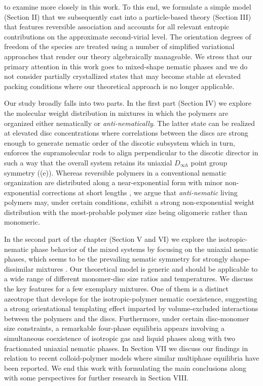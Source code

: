 to examine more closely in this work. To this end, we formulate a simple model (Section II) that we subsequently cast into  a  particle-based theory (Section III) that features reversible association and accounts for all relevant entropic contributions on the approximate second-virial level. The orientation degrees of freedom of the species are treated using a number of simplified variational approaches that render our theory algebraically manageable.    We stress that our primary attention in this work goes to mixed-shape nematic phases and we do not consider partially crystallized states that may become stable at elevated packing conditions where our theoretical approach is no longer applicable.


Our study broadly falls into two parts. In the first part (Section IV) we explore the molecular weight  distribution in mixtures in which the polymers are organized either nematically or {\em anti-nematically}. The latter state can be realized at elevated disc concentrations where  correlations between the discs are strong enough to generate nematic order of the discotic subsystem which in turn, enforces the supramolecular rods to align perpendicular to the discotic director in such a way that the overall system retains its  uniaxial $D_{\infty  h}$ point group symmetry ((e)). Whereas reversible polymers in a conventional nematic organization are distributed along a near-exponential form with minor non-exponential corrections at short lengths \cite{kuriabova2010},  we argue that {\em anti-nematic} living polymers may, under certain conditions, exhibit a strong non-exponential weight distribution with the most-probable polymer size being oligomeric rather than monomeric. 

In the second part of the chapter (Section V and VI) we explore the isotropic-nematic phase behavior of the mixed systems by focusing on the uniaxial nematic phases, which seems to be the prevailing nematic symmetry for strongly shape-dissimilar mixtures \cite{wensinkrodplate,campallenbolhuisfrenkel,varga2002,matsuda2003,jacksonbiax}. Our theoretical model is generic and should be applicable to a wide range of different monomer-disc size ratios and temperatures. We discuss the key features for a few exemplary mixtures. One of them is a distinct azeotrope that develops for the isotropic-polymer nematic coexistence, suggesting a strong orientational templating effect imparted by volume-excluded interactions between the polymers and the discs.  Furthermore,  under certain disc-monomer size constraints,  a remarkable four-phase equilibria appears involving a simultaneous coexistence of isotropic gas and liquid phases along with two fractionated uniaxial nematic phases. In Section VII we discuss our findings in relation to recent colloid-polymer models where similar multiphase equilibria have been reported. We end this work with formulating the main conclusions along with some perspectives for further research in Section VIII. 


